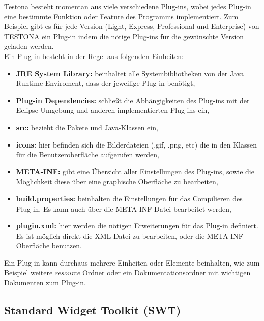 Testona besteht momentan aus viele verschiedene Plug-ins, wobei jedes Plug-in eine bestimmte Funktion oder Feature des Programms implementiert. Zum Beispiel gibt es für jede Version (Light, Express, Professional und Enterprise) von TESTONA ein Plug-in indem die nötige Plug-ins für die gewünschte Version geladen werden.\\

Ein Plug-in besteht in der Regel aus folgenden Einheiten:

\begin{itemize}
\item \textbf{JRE System Library:} beinhaltet alle Systembibliotheken von der Java Runtime Enviroment, dass der jeweilige Plug-in benötigt,

\item \textbf{Plug-in Dependencies:} schließt die Abhängigkeiten des Plug-ins mit der Eclipse Umgebung und anderen implementierten Plug-ins ein,

\item \textbf{src:} bezieht die Pakete und Java-Klassen ein,

\item \textbf{icons:} hier befinden sich die Bilderdateien (.gif, .png, etc) die in den Klassen für die Benutzeroberfläche  aufgerufen werden,

\item \textbf{META-INF:} gibt eine Übersicht aller Einstellungen des Plug-ins, sowie die Möglichkeit diese über eine graphische Oberfläche zu bearbeiten,

\item \textbf{build.properties:} beinhalten die Einstellungen für das Compilieren des Plug-in. Es kann auch über die META-INF Datei bearbeitet werden,

\item \textbf{plugin.xml:} hier werden die nötigen Erweiterungen für das Plug-in definiert. Es ist möglich direkt die XML Datei zu bearbeiten, oder die META-INF Oberfläche benutzen.


\end{itemize}

Ein Plug-in kann durchaus mehrere Einheiten oder Elemente beinhalten, wie zum Beispiel weitere \textit{resource} Ordner oder ein Dokumentationsordner mit wichtigen Dokumenten zum Plug-in.




\subsection{Standard Widget Toolkit (SWT)}
